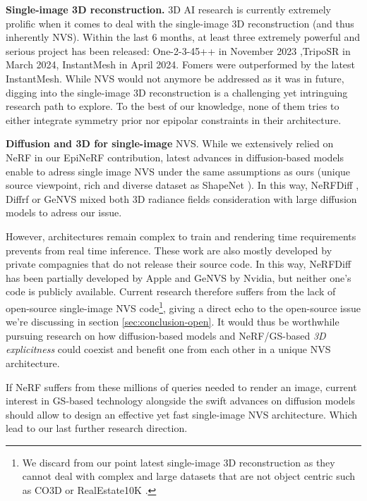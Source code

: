 \noindent \textbf{Single-image 3D reconstruction.} 3D \ac{AI} research is currently extremely prolific when it comes to deal with the single-image 3D reconstruction (and thus inherently \ac{NVS}). Within the last 6 months, at least three extremely powerful and serious project has been released:  One-2-3-45++ \citep{liu2023one2345++} in November 2023 ,TripoSR \citep{tochilkin2024triposr} in March 2024, InstantMesh \citep{xu2024instantmesh} in April 2024. Fomers were outperformed by the latest InstantMesh. While \ac{NVS} would not anymore be addressed as it was in future, digging into the single-image 3D reconstruction is a challenging yet intringuing research path to explore. To the best of our knowledge, none of them tries to either integrate symmetry prior nor epipolar constraints in their architecture.


\noindent \textbf{Diffusion and 3D for single-image} \ac{NVS}. While we extensively relied on \ac{NeRF} in our EpiNeRF contribution, latest advances in diffusion-based models enable to adress single image \ac{NVS} under the same assumptions as ours (unique source viewpoint, rich and diverse dataset as ShapeNet \citep{chang2015shapenet}). In this way, NeRFDiff \citep{gu2023nerfdiff}, Diffrf \citep{muller2023diffrf} or GeNVS \citep{chan2023genvs} mixed both 3D radiance fields consideration with large diffusion models to adress our issue. 

However, architectures remain complex to train and rendering time requirements prevents from real time inference. These work are also mostly developed by private compagnies that do not release their source code. In this way, NeRFDiff has been partially developed by Apple and GeNVS by Nvidia, but neither one's code is publicly available. Current research therefore suffers from the lack of open-source single-image \ac{NVS} code\footnote{We discard from our point latest single-image 3D reconstruction as they cannot deal with complex and large datasets that are not object centric such as CO3D \citep{reizenstein2021common}or RealEstate10K \citep{zhou2018stereo}.}, giving a direct echo to the open-source issue we're discussing in section \ref{sec:conclusion-open}. It would thus be worthwhile pursuing research on how diffusion-based models and \ac{NeRF}/\ac{GS}-based \textit{3D explicitness} could coexist and benefit one from each other in a unique \ac{NVS} architecture.

If \ac{NeRF} suffers from these millions of queries needed to render an image, current interest in \ac{GS}-based technology alongside the swift advances on diffusion models should allow to design an effective yet fast single-image \ac{NVS} architecture. Which lead to our last further research direction. 

